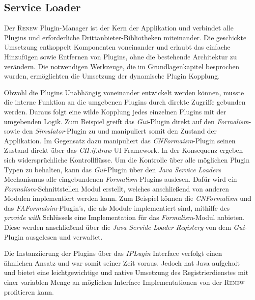 	\newpage
	\subsection{Service Loader} 
		Der \textsc{Renew} Plugin-Manager ist der Kern der Applikation und verbindet alle Plugins und erforderliche Drittanbieter-Bibliotheken miteinander. Die geschickte Umsetzung entkoppelt Komponenten voneinander und erlaubt das einfache Hinzufügen sowie Entfernen von Plugins, ohne die bestehende Architektur zu verändern. Die notwendigen Werkzeuge, die im Grundlagenkapitel besprochen wurden, ermöglichten die Umsetzung der dynamische Plugin Kopplung. \bigbreak

		Obwohl die Plugins Unabhängig voneinander entwickelt werden können, musste die interne Funktion an die umgebenen Plugins durch direkte Zugriffe gebunden werden. Daraus folgt eine wilde Kopplung jedes einzelnen Plugins mit der umgebenden Logik. Zum Beispiel greift das \textit{Gui}-Plugin direkt auf den \textit{Formalism}- sowie den \textit{Simulator}-Plugin zu und manipuliert somit den Zustand der Applikation. Im Gegensatz dazu manipuliert das \textit{CNFormaism}-Plugin seinen Zustand direkt über das \textit{CH.if.draw}-UI-Framework. In der Konsequenz ergeben sich widersprüchliche Kontrollflüsse.\newline  
		Um die Kontrolle über alle möglichen Plugin Typen zu behalten, kann das \textit{Gui}-Plugin über den \textit{Java Service Loaders} Mechanismus alle eingebundenen \textit{Formalism}-Plugins auslesen. Dafür wird ein \textit{Formalism}-Schnittstellen Modul erstellt, welches anschließend von anderen Modulen implementiert werden kann. Zum Beispiel können die \textit{CNFormalism} und das \textit{FAFormalsim}-Plugin's, die als Module implementiert sind, mithilfe des \textit{provide with} Schlüssels eine Implementation für das \textit{Formalism}-Modul anbieten. Diese werden anschließend über die \textit{Java Servide Loader Registery} von dem \textit{Gui}-Plugin ausgelesen und verwaltet. \bigbreak

		Die Instanziierung der Plugins über das \textit{IPLugin} Interface verfolgt einen ähnlichen Ansatz und war somit seiner Zeit voraus. Jedoch hat Java aufgeholt und bietet eine leichtgewichtige und native Umsetzung des Registrierdienstes mit einer variablen Menge an möglichen Interface Implementationen von der \textsc{Renew} profitieren kann.   

